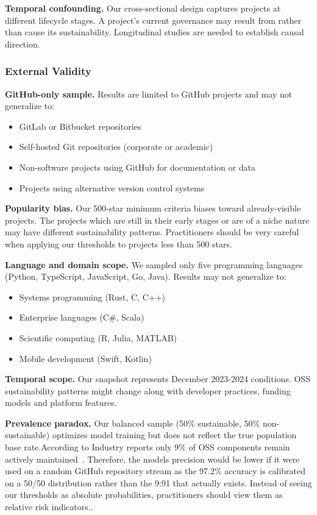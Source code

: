 \documentclass[conference]{IEEEtran}
\begin{document}
\textbf{Temporal confounding.} Our cross-sectional design captures projects at different lifecycle stages. A project's current governance may result from rather than cause its sustainability. Longitudinal studies are needed to establish causal direction.

\subsubsection{External Validity}

\textbf{GitHub-only sample.} Results are limited to GitHub projects and may not generalize to:
\begin{itemize}
    \item GitLab or Bitbucket repositories
    \item Self-hosted Git repositories (corporate or academic)
    \item Non-software projects using GitHub for documentation or data
    \item Projects using alternative version control systems
\end{itemize}

\textbf{Popularity bias.} Our 500-star minimum criteria biases toward already-visible projects. The projects which are still in their early stages or are of a niche nature may have different sustainability patterns. Practitioners should be very careful when applying our thresholds to projects less than 500 stars.

\textbf{Language and domain scope.} We sampled only five programming languages (Python, TypeScript, JavaScript, Go, Java). Results may not generalize to:
\begin{itemize}
    \item Systems programming (Rust, C, C++)
    \item Enterprise languages (C\#, Scala)
    \item Scientific computing (R, Julia, MATLAB)
    \item Mobile development (Swift, Kotlin)
\end{itemize}

\textbf{Temporal scope.} Our snapshot represents December 2023-2024 conditions. OSS sustainability patterns might change along with developer practices, funding models and platform features.

\textbf{Prevalence paradox.} Our balanced sample (50\% sustainable, 50\% non-sustainable) optimizes model training but does not reflect the true population base rate.According to Industry reports only 9\% of OSS components remain actively maintained~\cite{synopsys2024}. Therefore, the models precision would be lower if it were used on a random GitHub repository stream as the 97.2\% accuracy is calibrated on a 50/50 distribution rather than the 9:91 that actually exists. Instead of seeing our thresholds as absolute probabilities, practitioners should view them as relative risk indicators..
\end{document}
